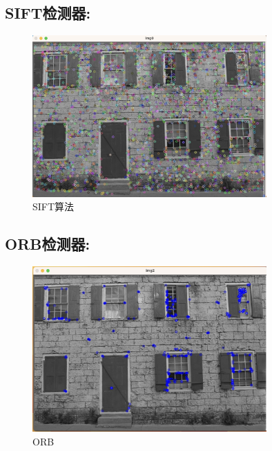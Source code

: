 \documentclass{article}
\begin{document}
\subsection*{SIFT检测器:}
\begin{figure}[H]
    \centering
    \includegraphics[width=0.8\textwidth]{2.png}
    \caption{\label{pr2}SIFT算法}
    \end{figure}

\subsection*{ORB检测器:}
    \begin{figure}[H]
        \centering
        \includegraphics[width=0.8\textwidth]{3.png}
        \caption{\label{pr2}ORB}
        \end{figure}
\end{document}
